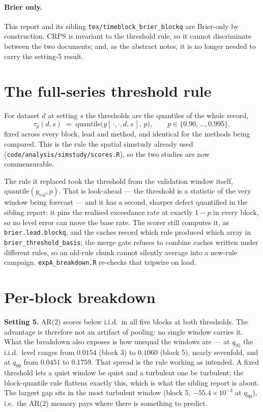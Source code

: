 \documentclass[11pt]{article}
\newcommand{\code}[1]{\texttt{#1}}
\newcommand{\tblpath}{../../code/analysis/time_block_forecast/simstudy/output/tables}
\newcommand{\tbl}[1]{}
\begin{document}
\paragraph{Brier only.} This report and its sibling
\code{tex/timeblock\_brier\_blockq} are Brier-only by construction. CRPS
is invariant to the threshold rule, so it cannot discriminate between the
two documents; and, as the abstract notes, it is no longer needed to
carry the setting-5 result.

\section{The full-series threshold rule}

For dataset $d$ at setting $s$ the thresholds are the quantiles of the
whole record,
\[
  \tau_p(d,s) \;=\; \mathrm{quantile}\bigl(y[\,\cdot,\cdot,d,s\,],\,p\bigr),
  \qquad p \in \{0.90,\ldots,0.995\},
\]
fixed across every block, lead and method, and identical for the methods
being compared. This is the rule the spatial simstudy already used
(\code{code/analysis/simstudy/scores.R}), so the two studies are now
commensurable.

The rule it replaced took the threshold from the validation window
itself, $\mathrm{quantile}(y_{\mathrm{val}}, p)$. That is look-ahead --- the
threshold is a statistic of the very window being forecast --- and it has
a second, sharper defect quantified in the sibling report: it pins the
realised exceedance rate at exactly $1-p$ in every block, so no level
error can move the base rate. The scorer still computes it, as
\code{brier.lead.blockq}, and the caches record which rule produced which
array in \code{brier\_threshold\_basis}; the merge gate refuses to
combine caches written under different rules, so an old-rule chunk cannot
silently average into a new-rule campaign. \code{expA\_breakdown.R}
re-checks that tripwire on load.

\section{Per-block breakdown}
\label{sec:block}

\tbl{expA_block_full}

\noindent\textbf{Setting 5.} AR(2) scores below i.i.d.\ in all five
blocks at both thresholds. The advantage is therefore not an artifact of
pooling: no single window carries it. What the breakdown also exposes is
how unequal the windows are --- at $q_{95}$ the i.i.d.\ level ranges from
$0.0154$ (block 3) to $0.1060$ (block 5), nearly sevenfold, and at
$q_{90}$ from $0.0451$ to $0.1759$. That spread is the rule working as
intended. A fixed threshold lets a quiet window be quiet and a turbulent
one be turbulent; the block-quantile rule flattens exactly this, which is
what the sibling report is about. The largest gap sits in the most
turbulent window (block 5, $-55.4 \times 10^{-3}$ at $q_{90}$), i.e.\ the
AR(2) memory pays where there is something to predict.
\end{document}
